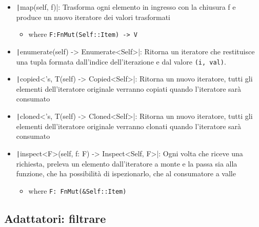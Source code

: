 \begin{itemize}
  \item \texttt|map(self, f)|: Trasforma ogni elemento in ingresso con la chiusura f e produce un nuovo iteratore dei valori trasformati
        \begin{itemize}
          \item[] where \verb|F:FnMut(Self::Item) -> V|
        \end{itemize}
  \item \texttt|enumerate(self) -> Enumerate<Self>|: Ritorna un iteratore che restituisce una tupla formata dall'indice dell'iterazione e dal valore \verb|(i, val)|.
  \item \texttt|copied<'s, T(self) -> Copied<Self>|: Ritorna un
        nuovo iteratore, tutti gli elementi dell'iteratore originale verranno copiati
        quando l'iteratore sarà consumato
  \item \texttt|cloned<'s, T(self) -> Cloned<Self>|: Ritorna un
        nuovo iteratore, tutti gli elementi dell'iteratore originale verranno clonati
        quando l'iteratore sarà consumato

  \item \texttt|inspect<F>(self, f: F) -> Inspect<Self, F>|: Ogni
        volta che riceve una richiesta, preleva un elemento dall'iteratore a monte e
        la passa sia alla funzione, che ha possibilità di ispezionarlo, che al
        consumatore a valle
        \begin{itemize}
          \item[] where \verb|F: FnMut(&Self::Item)|
        \end{itemize}

\end{itemize}


\subsection{Adattatori: filtrare}

